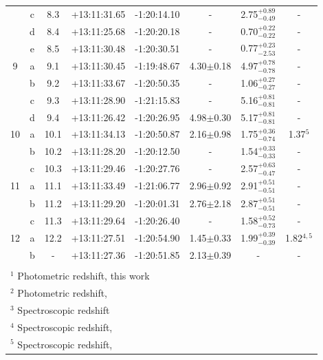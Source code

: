 \documentclass[useAMS,usenatbib]{mn2e}
\begin{document}
\begin{table}
\begin{tabular}{cccccccc}
          & c &  8.3 & +13:11:31.65 & -1:20:14.10 &      -        & 2.75$^{+0.89}_{-0.49}$ &       -      \\
          & d &  8.4 & +13:11:25.68 & -1:20:20.18 &      -        & 0.70$^{+0.22}_{-0.22}$ &       -      \\
          & e &  8.5 & +13:11:30.48 & -1:20:30.51 &      -        & 0.77$^{+0.23}_{-2.53}$ &       -      \\
     \hline	 						   			  					  
        9 & a &  9.1 & +13:11:30.45 & -1:19:48.67 & 4.30$\pm$0.18 & 4.97$^{+0.78}_{-0.78}$ &       -      \\
          & b &  9.2 & +13:11:33.67 & -1:20:50.35 &      -        & 1.06$^{+0.27}_{-0.27}$ &       -      \\
          & c &  9.3 & +13:11:28.90 & -1:21:15.83 &      -        & 5.16$^{+0.81}_{-0.81}$ &       -      \\
          & d &  9.4 & +13:11:26.42 & -1:20:26.95 & 4.98$\pm$0.30 & 5.17$^{+0.81}_{-0.81}$ &       -      \\
     \hline							   			  					  
       10 & a & 10.1 & +13:11:34.13 & -1:20:50.87 & 2.16$\pm$0.98 & 1.75$^{+0.36}_{-0.74}$ & 1.37$^{5}$   \\
          & b & 10.2 & +13:11:28.20 & -1:20:12.50 &      -        & 1.54$^{+0.33}_{-0.33}$ &       -      \\
          & c & 10.3 & +13:11:29.46 & -1:20:27.76 &      -        & 2.57$^{+0.63}_{-0.47}$ &       -      \\
     \hline							   			  					  
       11 & a & 11.1 & +13:11:33.49 & -1:21:06.77 & 2.96$\pm$0.92 & 2.91$^{+0.51}_{-0.51}$ &       -      \\
          & b & 11.2 & +13:11:29.20 & -1:20:01.31 & 2.76$\pm$2.18 & 2.87$^{+0.51}_{-0.51}$ &       -      \\
          & c & 11.3 & +13:11:29.64 & -1:20:26.40 &      -        & 1.58$^{+0.52}_{-0.73}$ &       -      \\
     \hline							   			  					  
       12 & a & 12.2 & +13:11:27.51 & -1:20:54.90 & 1.45$\pm$0.33 & 1.99$^{+0.39}_{-0.39}$ & 1.82$^{4,5}$ \\
          & b &   -  & +13:11:27.36 & -1:20:51.85 & 2.13$\pm$0.39 &          -             &       -      \\
    \hline\\
    \multicolumn{7}{l}{$^1$ Photometric redshift, this work}\\
    \multicolumn{7}{l}{$^2$ Photometric redshift, \citealt{broadhurst:05}}\\
    \multicolumn{7}{l}{$^3$ Spectroscopic redshift}\\
    \multicolumn{7}{l}{$^4$ Spectroscopic redshift, \citealt{golse:phd}}\\
    \multicolumn{7}{l}{$^5$ Spectroscopic redshift, \citealt{broadhurst:05}}\\
  \end{tabular}
  \label{tab:app:details}
\end{table}
\end{document}
